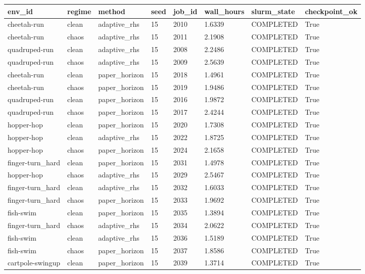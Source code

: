 \begin{tabular}{llllllll}
\toprule
env\_id & regime & method & seed & job\_id & wall\_hours & slurm\_state & checkpoint\_ok \\
\midrule
cheetah-run & clean & adaptive\_rhs & 15 & 2010 & 1.6339 & COMPLETED & True \\
cheetah-run & chaos & adaptive\_rhs & 15 & 2011 & 2.1908 & COMPLETED & True \\
quadruped-run & clean & adaptive\_rhs & 15 & 2008 & 2.2486 & COMPLETED & True \\
quadruped-run & chaos & adaptive\_rhs & 15 & 2009 & 2.5639 & COMPLETED & True \\
cheetah-run & clean & paper\_horizon & 15 & 2018 & 1.4961 & COMPLETED & True \\
cheetah-run & chaos & paper\_horizon & 15 & 2019 & 1.9486 & COMPLETED & True \\
quadruped-run & clean & paper\_horizon & 15 & 2016 & 1.9872 & COMPLETED & True \\
quadruped-run & chaos & paper\_horizon & 15 & 2017 & 2.4244 & COMPLETED & True \\
hopper-hop & clean & paper\_horizon & 15 & 2020 & 1.7308 & COMPLETED & True \\
hopper-hop & clean & adaptive\_rhs & 15 & 2022 & 1.8725 & COMPLETED & True \\
hopper-hop & chaos & paper\_horizon & 15 & 2024 & 2.1658 & COMPLETED & True \\
finger-turn\_hard & clean & paper\_horizon & 15 & 2031 & 1.4978 & COMPLETED & True \\
hopper-hop & chaos & adaptive\_rhs & 15 & 2029 & 2.5467 & COMPLETED & True \\
finger-turn\_hard & clean & adaptive\_rhs & 15 & 2032 & 1.6033 & COMPLETED & True \\
finger-turn\_hard & chaos & paper\_horizon & 15 & 2033 & 1.9692 & COMPLETED & True \\
fish-swim & clean & paper\_horizon & 15 & 2035 & 1.3894 & COMPLETED & True \\
finger-turn\_hard & chaos & adaptive\_rhs & 15 & 2034 & 2.0622 & COMPLETED & True \\
fish-swim & clean & adaptive\_rhs & 15 & 2036 & 1.5189 & COMPLETED & True \\
fish-swim & chaos & paper\_horizon & 15 & 2037 & 1.8586 & COMPLETED & True \\
cartpole-swingup & clean & paper\_horizon & 15 & 2039 & 1.3714 & COMPLETED & True \\

\end{tabular}
